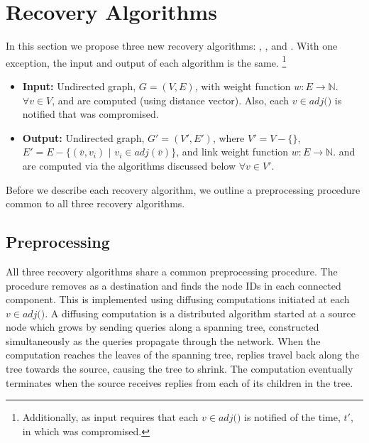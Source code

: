 \section{Recovery Algorithms}
\label{sec:algs}

In this section we propose three new recovery algorithms: \seconds, \purges, and \cprs.  
With one exception, the input and output of each algorithm is the same. 
{\footnote {\small Additionally, as input \cpr requires that each $v \in adj($\bads$)$ is notified of the time, $t'$, in which \bad was compromised.}}
\begin{itemize}
	\item {\bf Input:}  Undirected graph, $G=(V,E)$, with weight function $w: E \rightarrow \mathbb{N}$.  $\forall v \in V$,  \minvv and \dmatrixv are computed
(using distance vector). Also, each $v \in adj($\bads$)$ is notified that \bad was compromised.

	\item {\bf Output:} Undirected graph, $G'=(V',E')$, where $V' = V -\{$\bads$\}$, $E'=E - \{(\bar{v},v_i)$ $|$ $v_i \in adj(\bar{v}) \}$,
and link weight function $w:E \rightarrow \mathbb{N}$.  \minvv and \dmatrixv are computed via the algorithms discussed below $\forall  v \in V'$. 
\end{itemize}
Before we describe each recovery algorithm, we outline a preprocessing procedure common to all three recovery algorithms.


\subsection{Preprocessing}
\label{subsec:preprocess}
All three recovery algorithms share a common preprocessing procedure.  The procedure removes \bad as a destination and finds the node IDs in each connected component. 
This is implemented using diffusing computations \cite{Dijkstra80} initiated at each $v \in adj($\bads$)$. 
A diffusing computation is a distributed algorithm started at a source
node which grows by sending queries along a spanning tree, constructed
simultaneously as the queries propagate through the network.  When the computation reaches the leaves
of the spanning tree, replies travel back along the tree towards the
source, causing the tree to shrink. The computation eventually terminates when the
source receives replies from each of its children in the tree. 

